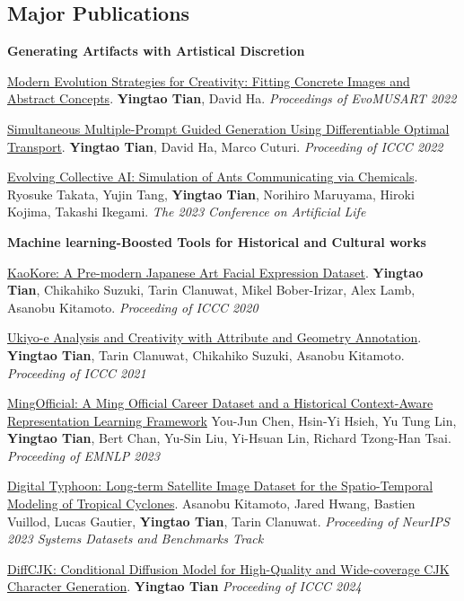 \documentclass[line,margin]{cv}
\begin{document}
\begin{resume}
\section{Major Publications}

  \textbf{Generating Artifacts with Artistical Discretion}

  \href{https://arxiv.org/abs/2109.08857}{Modern Evolution Strategies for Creativity: Fitting Concrete Images and Abstract Concepts}.
  \textbf{Yingtao Tian}, David Ha.
  \emph{Proceedings of EvoMUSART 2022}

  \href{https://arxiv.org/abs/2204.08472}{Simultaneous Multiple-Prompt Guided Generation Using Differentiable Optimal Transport}.
  \textbf{Yingtao Tian}, David Ha, Marco Cuturi. \emph{Proceeding of ICCC 2022}

  \href{https://direct.mit.edu/isal/proceedings-pdf/isal/35/112/2149148/isal_a_00676.pdf}{Evolving Collective AI: Simulation of Ants Communicating via Chemicals}.
  Ryosuke Takata, Yujin Tang, \textbf{Yingtao Tian}, Norihiro Maruyama, Hiroki Kojima, Takashi Ikegami. 
  \emph{The 2023 Conference on Artificial Life}

  \textbf{Machine learning-Boosted Tools for Historical and Cultural works}

  \href{https://arxiv.org/abs/2002.08595}{KaoKore: A Pre-modern Japanese Art Facial Expression Dataset}.
  \textbf{Yingtao Tian}, Chikahiko Suzuki, Tarin Clanuwat, Mikel Bober-Irizar, Alex Lamb, Asanobu Kitamoto. 
  \emph{Proceeding of ICCC 2020}

  \href{https://arxiv.org/abs/2106.02267}{Ukiyo-e Analysis and Creativity with Attribute and Geometry Annotation}.
  \textbf{Yingtao Tian}, Tarin Clanuwat, Chikahiko Suzuki, Asanobu Kitamoto. 
  \emph{Proceeding of ICCC 2021}

  \href{https://aclanthology.org/2023.emnlp-main.266/}{MingOfficial: A Ming Official Career Dataset and a Historical Context-Aware Representation Learning Framework}
  You-Jun Chen, Hsin-Yi Hsieh, Yu Tung Lin, \textbf{Yingtao Tian}, Bert Chan, Yu-Sin Liu, Yi-Hsuan Lin, Richard Tzong-Han Tsai. 
  \emph{Proceeding of EMNLP 2023}

  \href{https://arxiv.org/abs/2311.02665}{Digital Typhoon: Long-term Satellite Image Dataset for the Spatio-Temporal Modeling of Tropical Cyclones}.
  Asanobu Kitamoto, Jared Hwang, Bastien Vuillod, Lucas Gautier, \textbf{Yingtao Tian}, Tarin Clanuwat. 
  \emph{Proceeding of NeurIPS 2023 Systems Datasets and Benchmarks Track}

  \href{https://arxiv.org/abs/2404.05212}{DiffCJK: Conditional Diffusion Model for High-Quality and Wide-coverage CJK Character Generation}.
  \textbf{Yingtao Tian} \emph{Proceeding of ICCC 2024}


\end{resume}
\end{document}

